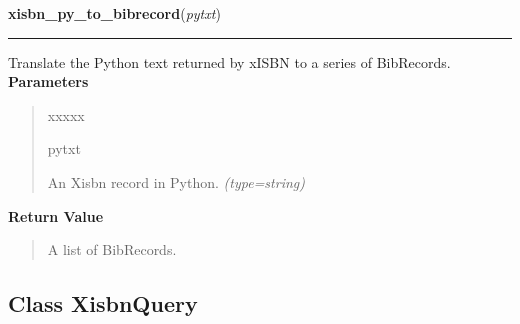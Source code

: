 \hspace{.8\funcindent}\begin{boxedminipage}{\funcwidth}

    \raggedright \textbf{xisbn\_py\_to\_bibrecord}(\textit{pytxt})

    \vspace{-1.5ex}

    \rule{\textwidth}{0.5\fboxrule}
\setlength{\parskip}{2ex}

Translate the Python text returned by xISBN to a series of BibRecords.
\setlength{\parskip}{1ex}
      \textbf{Parameters}
      \vspace{-1ex}

      \begin{quote}
        \begin{Ventry}{xxxxx}

          \item[pytxt]


An Xisbn record in Python.
            {\it (type=string)}

        \end{Ventry}

      \end{quote}

      \textbf{Return Value}
    \vspace{-1ex}

      \begin{quote}

A list of BibRecords.
      \end{quote}

    \end{boxedminipage}



\subsection{Class XisbnQuery}

